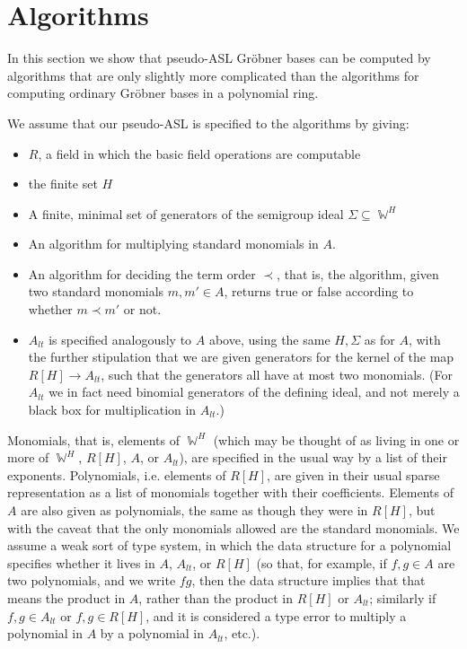\documentclass[11pt,reqno]{amsart}
\DeclareMathOperator{\W}{\mathbb{W}}
\theoremstyle{definition}
\numberwithin{equation}{section}
\begin{document}

\section{Algorithms}
\label{sec:algorithms}

In this section we show that pseudo-ASL Gröbner bases can be computed by algorithms that are only slightly more complicated than the algorithms for computing ordinary Gröbner bases in a polynomial ring.

We assume that our pseudo-ASL is specified to the algorithms by giving: 
\begin{itemize}
\item $R$, a field in which the basic field operations are computable
\item the finite set $H$
\item A finite, minimal set of generators of the semigroup ideal $\Sigma \subseteq \W^H$
\item An algorithm for multiplying standard monomials in $A$. 
\item An algorithm for deciding the term order $\prec$, that is, the algorithm, given two standard monomials $m,m' \in A$, returns true or false according to whether $m \prec m'$ or not.
\item $A_{lt}$ is specified analogously to $A$ above, using the same $H,\Sigma$ as for $A$, with the further stipulation that we are given generators for the kernel of the map $R[H] \to A_{lt}$, such that the generators all have at most two monomials.
(For $A_{lt}$ we in fact need binomial generators of the defining ideal, and not merely a black box for multiplication in $A_{lt}$.)
\end{itemize}

Monomials, that is, elements of $\W^H$ (which may be thought of as living in one or more of $\W^H$, $R[H]$, $A$, or $A_{lt}$), are specified in the usual way by a list of their exponents. Polynomials, i.e. elements of $R[H]$, are given in their usual sparse representation as a list of monomials together with their coefficients. Elements of $A$ are also given as polynomials, the same as though they were in $R[H]$, but with the caveat that the only monomials allowed are the standard monomials. We assume a weak sort of type system, in which the data structure for a polynomial specifies whether it lives in $A$, $A_{lt}$, or $R[H]$ (so that, for example, if $f,g \in A$ are two polynomials, and we write $fg$, then the data structure implies that that means the product in $A$, rather than the product in $R[H]$ or $A_{lt}$; similarly if $f,g \in A_{lt}$ or $f,g \in R[H]$, and it is considered a type error to multiply a polynomial in $A$ by a polynomial in $A_{lt}$, etc.).
\end{document}
